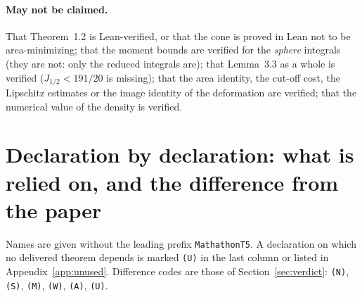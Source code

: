 \documentclass[11pt]{article}
\newcommand{\Ln}[1]{\texttt{#1}}
\newcommand{\No}{\texttt{(N)}}
\newcommand{\Sc}{\texttt{(S)}}
\newcommand{\Me}{\texttt{(M)}}
\newcommand{\Wk}{\texttt{(W)}}
\newcommand{\As}{\texttt{(A)}}
\newcommand{\Us}{\texttt{(U)}}
\begin{document}
\paragraph{May not be claimed.} That Theorem~1.2 is Lean-verified, or that the cone is proved in
Lean not to be area-minimizing; that the moment bounds are verified for the \emph{sphere}
integrals (they are not: only the reduced integrals are); that Lemma~3.3 as a whole is verified
($J_{1/2}<191/20$ is missing); that the area identity, the cut-off cost, the Lipschitz estimates
or the image identity of the deformation are verified; that the numerical value of the density
is verified.

\appendix

\section{Declaration by declaration: what is relied on, and the difference from the paper}
\label{app:decls}

Names are given without the leading prefix \Ln{MathathonT5}. A declaration on which no delivered
theorem depends is marked \Us{} in the last column or listed in Appendix~\ref{app:unused}.
Difference codes are those of Section~\ref{sec:verdict}: \No, \Sc, \Me, \Wk, \As, \Us.
\end{document}
